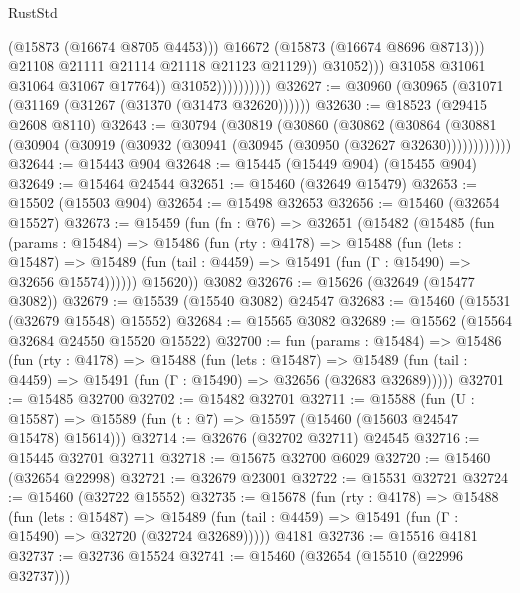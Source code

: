 \begin{lexlean}{RustStd}
\begin{coremodule}
                                          (@15873 (@16674 @8705 @4453)))
                                        @16672
                                        (@15873 (@16674 @8696 @8713)))
                                      @21108
                                      @21111
                                      @21114
                                      @21118
                                      @21123
                                      @21129))
                                  @31052)))
                            @31058
                            @31061
                            @31064
                            @31067
                            @17764))
                        @31052))))))))))
@32627 := @30960 (@30965 (@31071 (@31169 (@31267 (@31370 (@31473 @32620))))))
@32630 := @18523 (@29415 @2608 @8110)
@32643 := @30794
    (@30819
      (@30860
        (@30862
          (@30864 (@30881 (@30904 (@30919 (@30932 (@30941 (@30945 (@30950 (@32627 @32630))))))))))))
@32644 := @15443 @904
@32648 := @15445 (@15449 @904) (@15455 @904)
@32649 := @15464 @24544
@32651 := @15460 (@32649 @15479)
@32653 := @15502 (@15503 @904)
@32654 := @15498 @32653
@32656 := @15460 (@32654 @15527)
@32673 := @15459
    (fun (fn : @76) =>
    @32651
      (@15482
        (@15485
          (fun (params : @15484) =>
          @15486
            (fun (rty : @4178) =>
            @15488
              (fun (lets : @15487) =>
              @15489 (fun (tail : @4459) => @15491 (fun (Γ : @15490) => @32656 @15574))))))
        @15620))
    @3082
@32676 := @15626 (@32649 (@15477 @3082))
@32679 := @15539 (@15540 @3082) @24547
@32683 := @15460 (@15531 (@32679 @15548) @15552)
@32684 := @15565 @3082
@32689 := @15562 (@15564 @32684 @24550 @15520 @15522)
@32700 := fun (params : @15484) =>
  @15486
    (fun (rty : @4178) =>
    @15488
      (fun (lets : @15487) =>
      @15489 (fun (tail : @4459) => @15491 (fun (Γ : @15490) => @32656 (@32683 @32689)))))
@32701 := @15485 @32700
@32702 := @15482 @32701
@32711 := @15588
    (fun (U : @15587) => @15589 (fun (t : @7) => @15597 (@15460 (@15603 @24547 @15478) @15614)))
@32714 := @32676 (@32702 @32711) @24545
@32716 := @15445 @32701 @32711
@32718 := @15675 @32700 @6029
@32720 := @15460 (@32654 @22998)
@32721 := @32679 @23001
@32722 := @15531 @32721
@32724 := @15460 (@32722 @15552)
@32735 := @15678
    (fun (rty : @4178) =>
    @15488
      (fun (lets : @15487) =>
      @15489 (fun (tail : @4459) => @15491 (fun (Γ : @15490) => @32720 (@32724 @32689)))))
    @4181
@32736 := @15516 @4181
@32737 := @32736 @15524
@32741 := @15460 (@32654 (@15510 (@22996 @32737)))

\end{coremodule}
\end{lexlean}
